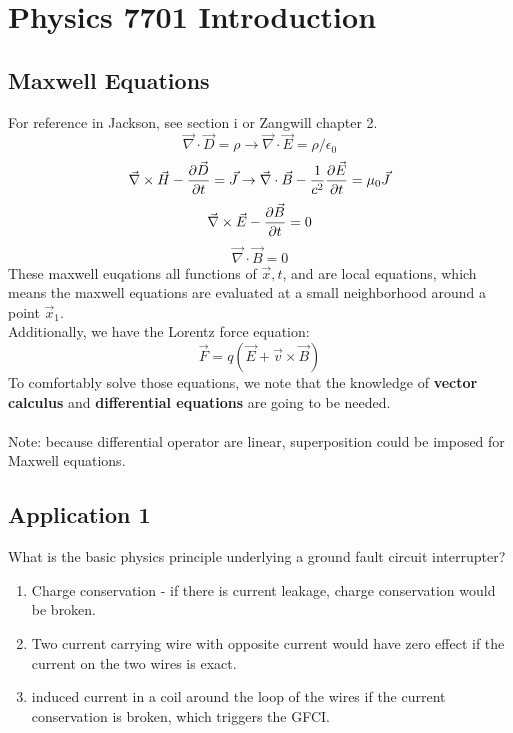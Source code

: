 \documentclass{article}
\begin{document}
\section*{Physics 7701 Introduction}
\subsection*{Maxwell Equations}
For reference in Jackson, see section i or Zangwill chapter 2. \\ 

\begin{equation*}
\vec{\nabla} \cdot  \vec{D} = \rho \to \vec{\nabla} \cdot \vec{E} = \rho /\epsilon_0  
\end{equation*}
\begin{equation*}
  \vec{\nabla} \times   \vec{H}  - \pdv{\vec{D} }{t}= \vec{J}  \to \vec{\nabla} \cdot \vec{B} - \frac{1}{c^2} \pdv{\vec{E} }{t} = \mu_0 \vec{J}    
\end{equation*}
\begin{equation*}
  \vec{\nabla} \times   \vec{E}  - \pdv{\vec{B} }{t}= 0
\end{equation*}
\begin{equation*}
\vec{\nabla} \cdot  \vec{B} = 0
\end{equation*}
These maxwell euqations  all functions of $\vec{x} ,t$, and are local equations, which means the maxwell equations are evaluated at a small neighborhood around a point $\vec{x}_1$. \\ 
Additionally, we have the Lorentz force equation:
\begin{equation*}
\vec{F} = q (\vec{E} + \vec{v} \times \vec{B})
\end{equation*}
To comfortably solve those equations, we note that the knowledge of \textbf{vector calculus} and \textbf{differential equations} are going to be needed.  \\
\\ 
Note: because differential operator are linear, superposition could be imposed for Maxwell equations.

\subsection*{Application 1}
What is the basic physics principle underlying a ground fault circuit interrupter?
\begin{enumerate}
  \item Charge conservation - if there is current leakage, charge conservation would be broken.
  \item Two current carrying wire with opposite current would have zero effect if the current on the two wires is exact.
  \item induced current in a coil around the loop of the wires if the current conservation is broken, which triggers the GFCI.
\end{enumerate}
\end{document}
